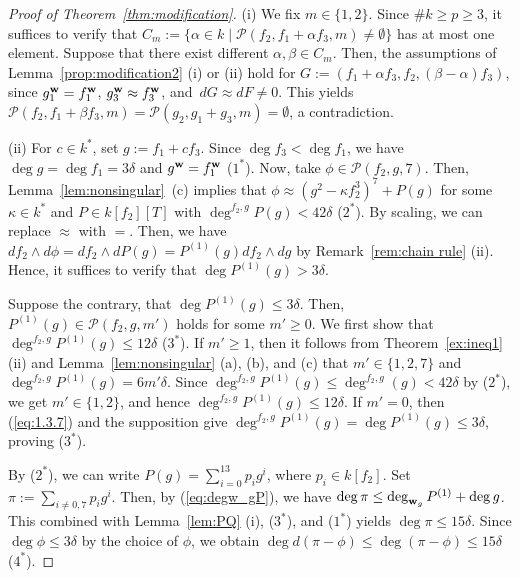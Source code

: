 \documentclass{amsart}
\theoremstyle{plain}
\theoremstyle{definition}
\newcommand{\w}{{\bf w}}
\begin{document}
\begin{proof}[Proof of Theorem~{\rm \ref{thm:modification}}]
(i) 
We fix $m\in \{ 1,2\} $. 
Since $\# k\ge p\ge 3$, 
it suffices to verify that 
$C_m:=\{ 
\alpha \in k\mid 
\mathcal{P}(f_2,f_1+\alpha f_3,m)\ne \emptyset \} $ 
has at most one element. 
Suppose that there exist 
different $\alpha ,\beta \in C_m$. 
Then, 
the assumptions of Lemma~\ref{prop:modification2} (i) or (ii) 
hold for 
$G:=(f_1+\alpha f_3,f_2,(\beta -\alpha )f_3)$, 
since $g_1^{\w }=f_1^{\w }$, $g_3^{\w }\approx f_3^{\w }$, 
and~$dG\approx dF\ne 0$. 
This yields 
$\mathcal{P}(f_2,f_1+\beta f_3,m)=\mathcal{P}(g_2,g_1+g_3,m)=\emptyset $, 
a contradiction. 



(ii) 
For $c\in k^*$, set $g:=f_1+cf_3$. 
Since $\deg f_3<\deg f_1$, 
we have 
$\deg g=\deg f_1=3\delta $ and $g^{\w }=f_1^{\w }$ ($1^*$). 
Now, 
take $\phi \in \mathcal{P}(f_2,g,7)$. 
Then, 
Lemma~\ref{lem:nonsingular}~(c) 
implies that $\phi \approx (g^2-\kappa f_2^3)^7+P(g)$ 
for some $\kappa \in k^*$ 
and $P\in k[f_2][T]$ with 
$\deg ^{f_2,g}P(g)<42\delta $ ($2^*$). 
By scaling, 
we can replace $\approx $ with $=$. 
Then, 
we have~$df_2\wedge d\phi =df_2\wedge dP(g)=P^{(1)}(g)df_2\wedge dg$ 
by Remark~\ref{rem:chain rule} (ii). 
Hence, it suffices to verify that $\deg P^{(1)}(g)>3\delta $. 


Suppose the contrary, 
that $\deg P^{(1)}(g)\le 3\delta $. 
Then, 
$P^{(1)}(g)\in \mathcal{P}(f_2,g,m')$ holds for some $m'\ge 0$. 
We first show that $\deg ^{f_2,g}P^{(1)}(g)\le 12\delta $ ($3^*$). 
If $m'\ge 1$, then it follows from 
Theorem~\ref{ex:ineq1} (ii) and 
Lemma~\ref{lem:nonsingular} 
(a), (b), and (c) that 
$m'\in \{ 1,2,7\} $ and $\deg ^{f_2,g}P^{(1)}(g)=6m'\delta $. 
Since $\deg ^{f_2,g}P^{(1)}(g)\le \deg ^{f_2,g}(g)<42\delta $ 
by ($2^*$), 
we get $m'\in \{ 1,2\} $, 
and hence $\deg ^{f_2,g}P^{(1)}(g)\le 12\delta $. 
If $m'=0$, then (\ref{eq:1.3.7}) and the supposition give 
$\deg ^{f_2,g}P^{(1)}(g)=\deg P^{(1)}(g)\le 3\delta $, 
proving ($3^*$). 


By ($2^*$), 
we can write $P(g)=\sum _{i=0}^{13}p_ig^i$, 
where $p_i\in k[f_2]$. 
Set $\pi :=\sum _{i\ne 0,7}p_ig^i$. 
Then, 
by (\ref{eq:degw_gP}), we have 
$\deg \pi \le \deg _{\w _g}P^{(1)}+\deg g$. 
This combined with 
Lemma~\ref{lem:PQ} (i), ($3^*$), and ($1^*$) yields 
$\deg \pi \le 15\delta $. 
Since $\deg \phi \le 3\delta $ by the choice of $\phi $, 
we obtain $\deg d(\pi -\phi )\le \deg (\pi -\phi )\le 15\delta $ 
($4^*$). 




\end{proof}
\end{document}
